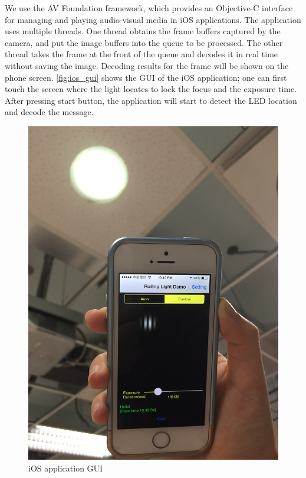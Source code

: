We use the AV Foundation framework, which provides an Objective-C interface for managing and playing audio-visual media in iOS applications. The application uses multiple threads. One thread obtains the frame buffers captured by the camera, and put the image buffers into the queue to be processed. The other thread takes the frame at the front of the queue and decodes it in real time without saving the image. Decoding results for the frame will be shown on the phone screen. \autoref{fig:ios_gui} shows the GUI of the iOS application; one can first touch the screen where the light locates to lock the focus and the exposure time. After pressing start button, the application will start to detect the LED location and decode the message.


\begin{figure}[!t]
  \centering
  \includegraphics[scale=0.075]{pic/ios_using.JPG}
  \caption{iOS application GUI}
  \label{fig:ios_gui}
\end{figure}

